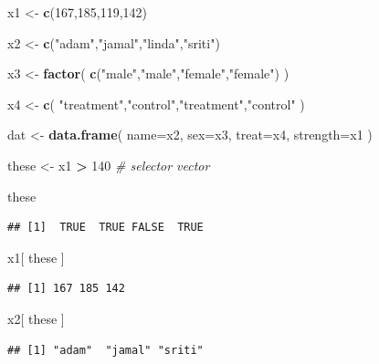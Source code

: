 \documentclass[]{book}
\newenvironment{Shaded}{\begin{snugshade}}{\end{snugshade}}
\newcommand{\CommentTok}[1]{\textcolor[rgb]{0.56,0.35,0.01}{\textit{#1}}}
\newcommand{\DataTypeTok}[1]{\textcolor[rgb]{0.13,0.29,0.53}{#1}}
\newcommand{\DecValTok}[1]{\textcolor[rgb]{0.00,0.00,0.81}{#1}}
\newcommand{\KeywordTok}[1]{\textcolor[rgb]{0.13,0.29,0.53}{\textbf{#1}}}
\newcommand{\NormalTok}[1]{#1}
\newcommand{\OperatorTok}[1]{\textcolor[rgb]{0.81,0.36,0.00}{\textbf{#1}}}
\newcommand{\StringTok}[1]{\textcolor[rgb]{0.31,0.60,0.02}{#1}}
\theoremstyle{definition}
\theoremstyle{definition}
\theoremstyle{definition}
\theoremstyle{remark}
\begin{document}
\begin{Shaded}
\begin{Highlighting}[]
\NormalTok{x1 <-}\StringTok{ }\KeywordTok{c}\NormalTok{(}\DecValTok{167}\NormalTok{,}\DecValTok{185}\NormalTok{,}\DecValTok{119}\NormalTok{,}\DecValTok{142}\NormalTok{)}

\NormalTok{x2 <-}\StringTok{ }\KeywordTok{c}\NormalTok{(}\StringTok{"adam"}\NormalTok{,}\StringTok{"jamal"}\NormalTok{,}\StringTok{"linda"}\NormalTok{,}\StringTok{"sriti"}\NormalTok{)}

\NormalTok{x3 <-}\StringTok{ }\KeywordTok{factor}\NormalTok{( }\KeywordTok{c}\NormalTok{(}\StringTok{"male"}\NormalTok{,}\StringTok{"male"}\NormalTok{,}\StringTok{"female"}\NormalTok{,}\StringTok{"female"}\NormalTok{) )}

\NormalTok{x4 <-}\StringTok{ }\KeywordTok{c}\NormalTok{( }\StringTok{"treatment"}\NormalTok{,}\StringTok{"control"}\NormalTok{,}\StringTok{"treatment"}\NormalTok{,}\StringTok{"control"}\NormalTok{ )}

\NormalTok{dat <-}\StringTok{ }\KeywordTok{data.frame}\NormalTok{( }\DataTypeTok{name=}\NormalTok{x2, }\DataTypeTok{sex=}\NormalTok{x3, }\DataTypeTok{treat=}\NormalTok{x4, }\DataTypeTok{strength=}\NormalTok{x1 )}


\NormalTok{these <-}\StringTok{ }\NormalTok{x1 }\OperatorTok{>}\StringTok{ }\DecValTok{140}     \CommentTok{# selector vector}

\NormalTok{these}
\end{Highlighting}
\end{Shaded}

\begin{verbatim}
## [1]  TRUE  TRUE FALSE  TRUE
\end{verbatim}

\begin{Shaded}
\begin{Highlighting}[]
\NormalTok{x1[ these ]}
\end{Highlighting}
\end{Shaded}

\begin{verbatim}
## [1] 167 185 142
\end{verbatim}

\begin{Shaded}
\begin{Highlighting}[]
\NormalTok{x2[ these ]}
\end{Highlighting}
\end{Shaded}

\begin{verbatim}
## [1] "adam"  "jamal" "sriti"
\end{verbatim}
\end{document}
